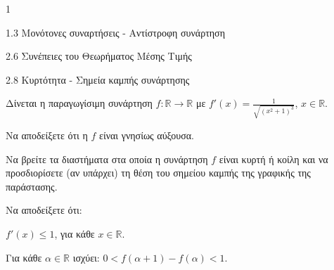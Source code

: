 \begin{ylh}{1}
    \item 1.3 Μονότονες συναρτήσεις - Αντίστροφη συνάρτηση
    \item 2.6 Συνέπειες του Θεωρήματος Μέσης Τιμής
    \item 2.8 Κυρτότητα - Σημεία καμπής συνάρτησης
\end{ylh}

Δίνεται η παραγωγίσιμη συνάρτηση $f: \mathbb{R} \to \mathbb{R}$ με $f'(x) = \frac{1}{\sqrt{(x^2+1)^3}}$, $x \in \mathbb{R}$.

\begin{alist}
\item Να αποδείξετε ότι η $f$ είναι γνησίως αύξουσα. 
\item Να βρείτε τα διαστήματα στα οποία η συνάρτηση $f$ είναι κυρτή ή κοίλη και να προσδιορίσετε (αν υπάρχει) τη θέση του σημείου καμπής της γραφικής της παράστασης. 
\item Να αποδείξετε ότι:
    \begin{rlist}
    \item $f'(x) \leq 1$, για κάθε $x \in \mathbb{R}$. 
    \item Για κάθε $\alpha \in \mathbb{R}$ ισχύει: $0 < f(\alpha+1) - f(\alpha) < 1$. 
    \end{rlist}
\end{alist}